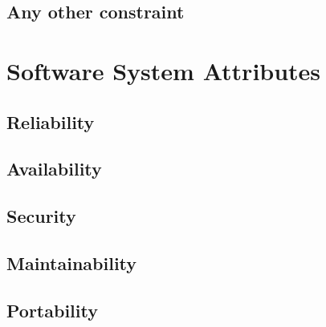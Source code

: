 \subsection{Any other constraint}
\label{subsec:any_other_constraint}%


\section{Software System Attributes}
\label{sec:software_system_attributes}%

\subsection{Reliability}
\label{subsec:reliability}%

\subsection{Availability}
\label{subsec:availability}%

\subsection{Security}
\label{subsec:security}%

\subsection{Maintainability}
\label{subsec:maintainability}%

\subsection{Portability}
\label{subsec:portability}%
